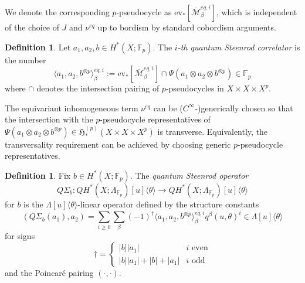 \documentclass[reqno]{amsart}
\numberwithin{equation}{section}
\numberwithin{equation}{section}
\numberwithin{equation}{section}
\theoremstyle{definition}
\newtheorem{defn}[thm]{Definition}
\theoremstyle{remark}
\theoremstyle{remark}
\newtheorem{rem}[thm]{Remark}
\newcommand{\ov}{\overline}
\begin{document}
We denote the corresponding $p$-pseudocycle as $\mathrm{ev}_* [\ov{\mathcal{M}}^{eq, i}_\beta]$, which is independent of the choice of $J$ and $\nu^{eq}$ up to bordism by standard cobordism arguments.

\begin{defn}
    Let $a_1, a_2 , b\in H^*(X;\mathbb{F}_p)$. The  \emph{$i$-th quantum Steenrod correlator} is the number
    \begin{equation}
        \langle a_1, a_2, b^{\otimes p} \rangle_{\beta}^{eq, i} :=  \mathrm{ev}_*[\overline{\mathcal{M}}_\beta^{eq, i}] \cap \Psi(a_1 \otimes a_2 \otimes b^{\otimes p}) \in \mathbb{F}_p
    \end{equation}
    where $\cap$ denotes the intersection pairing of $p$-pseudocycles in $X \times X \times X^p$.
\end{defn}

The equivariant inhomogeneous term $\nu^{eq}$ can be ($C^\infty$-)generically chosen so that the intersection with the $p$-pseudocycle representatives of $\Psi(a_1 \otimes a_2 \otimes b^{\otimes p}) \in \mathfrak{H}_*^{(p)} (X \times X \times X^p)$ is transverse. Equivalently, the transversality requirement can be achieved by choosing generic $p$-pseudocycle representatives.

\begin{defn}
    Fix $b \in H^*(X;\mathbb{F}_p)$. The \emph{quantum Steenrod operator} $$Q\Sigma_b: QH^*(X;\Lambda_{\mathbb{F}_p})[u]\langle \theta \rangle \to QH^*(X;\Lambda_{\mathbb{F}_p})[u]\langle \theta \rangle$$ for $b$ is the $\Lambda[u]\langle \theta \rangle$-linear operator defined by the structure constants
    \begin{equation}
        (Q\Sigma_b (a_1), a_2) =  \sum_{i \ge 0} \sum_\beta (-1)^\dagger \langle a_1, a_2, b^{\otimes p} \rangle_\beta^{eq, i} q^\beta (u, \theta)^i \in \Lambda[u]\langle \theta \rangle
    \end{equation}
    for signs
    \begin{equation}
        \dagger = \begin{cases} |b||a_1| & i \mbox{ even} \\ |b||a_1| + |b| + |a_1| & i \mbox{ odd} \end{cases}
    \end{equation}
    and the Poincar\'e pairing $(\cdot, \cdot)$.
\end{defn}
\end{document}
